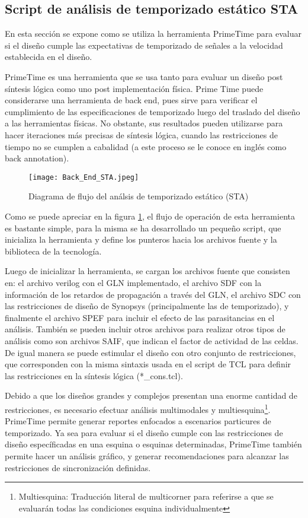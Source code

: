 \subsection{Script de análisis de temporizado estático STA}
\label{sec:STA}

En esta sección se expone como se utiliza la herramienta PrimeTime para evaluar si el diseño cumple las expectativas de temporizado de señales a la velocidad establecida en el diseño.

PrimeTime es una herramienta que se usa tanto para evaluar un diseño post síntesis lógica como uno post implementación física. Prime Time puede considerarse una herramienta de back end, pues sirve para verificar el cumplimiento de las especificaciones de temporizado luego del traslado del diseño a las herramientas físicas.  No obstante, sus resultados pueden utilizarse para hacer iteraciones más precisas de síntesis lógica, cuando las restricciones de tiempo no se cumplen a cabalidad (a este proceso se le conoce en inglés como back annotation).

\begin{figure}[ht]
\texttt{[image: Back\_End\_STA.jpeg]}
\caption{Diagrama de flujo del análsis de temporizado estático (STA)}
\label{fig:staflow}
\end{figure}

Como se puede apreciar en la figura \ref{fig:staflow}, el flujo de operación de esta herramienta es bastante simple, para la misma se ha desarrollado un pequeño script, que inicializa la herramienta y define los punteros hacia los archivos fuente y la biblioteca de la tecnología.

Luego de inicializar la herramienta, se cargan los archivos fuente que consisten en: el archivo verilog con el GLN implementado, el archivo SDF con la información de los retardos de propagación a través del GLN, el archivo SDC con las restricciones de diseño de Synopsys (principalmente las de temporizado), y finalmente el archivo SPEF para incluir el efecto de las parasitancias en el análisis. También se pueden incluir otros archivos para realizar otros tipos de análisis como son archivos SAIF, que indican el factor de actividad de las celdas. De igual manera se puede estimular el diseño con otro conjunto de restricciones, que corresponden con la misma sintaxis usada en el script de TCL para definir las restricciones en la síntesis lógica (*\_cons.tcl).

Debido a que los diseños grandes y complejos presentan una enorme cantidad de restricciones, es necesario efectuar análisis multimodales y multiesquina\footnote{Multiesquina: Traducción literal de multicorner para referirse a que se evaluarán todas las condiciones esquina individualmente}. PrimeTime permite generar reportes enfocados a escenarios particures de temporizado. Ya sea para evaluar si el diseño cumple con las restricciones de diseño específicadas en una esquina o esquinas determinadas, PrimeTime también permite hacer un análisis gráfico, y generar recomendaciones para alcanzar las restricciones de sincronización definidas.

